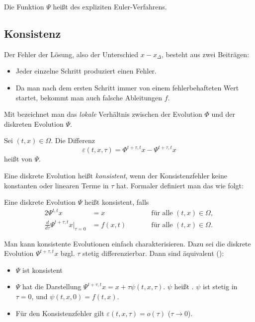Die Funktion $\Psi$ heißt  des expliziten Euler-Verfahrens.


\subsection{Konsistenz}

Der Fehler der Lösung, also der Unterschied $x - x_\Delta$, besteht aus zwei Beiträgen:
\begin{itemize}
	\item Jeder einzelne Schritt produziert einen Fehler.
	\item Da man nach dem ersten Schritt immer von einem fehlerbehafteten Wert startet, bekommt
	man auch falsche Ableitungen $f$.
\end{itemize}

Mit  bezeichnet man das \textit{lokale} Verhältnis zwischen der Evolution $\Phi$ und der diskreten Evolution $\Psi$.

\begin{defi}
	Sei $(t,x) \in \Omega$. Die Differenz 
	\begin{equation*}
		\varepsilon (t,x,\tau)=\Phi^{t+\tau,t} x-\Psi^{t+\tau,t} x
	\end{equation*}
	heißt  von $\Psi$.
\end{defi}

Eine diskrete Evolution heißt \emph{konsistent}, wenn der Konsistenzfehler keine
konstanten oder linearen Terme in $\tau$ hat. Formaler definiert man das wie folgt:

\begin{defi}
	Eine diskrete Evolution $\Psi$ heißt konsistent, falls
	\begin{alignat*}{2}
	\Psi^{t,t} x & =x &\qquad & \text{für alle $(t,x) \in \Omega$}, \\
	\frac{d}{d \tau} \Psi^{t+\tau,t} x \Big|_{\tau=0} & =f(x,t)
	&& \text{für alle $(t,x) \in \Omega$}.
	\end{alignat*}
\end{defi}


Man kann konsistente Evolutionen einfach charakterisieren. Dazu sei die diskrete Evolution $\Psi^{t+\tau,t} x$ bzgl. $\tau$ stetig differenzierbar. Dann sind äquivalent (\cite[Lemma~4.4]{deuflhard_bornemann:2008}):
\begin{itemize}
	\item $\Psi$ ist konsistent
	\item $\Psi$ hat die Darstellung $\Psi^{t+\tau,t} x=x+\tau \psi (t,x,\tau )$. $\psi$ heißt . $\psi$ ist stetig in $\tau = 0$, und $\psi (t,x,0)=f(t,x)$.
	\item Für den Konsistenzfehler gilt $\varepsilon (t,x,\tau)=o (\tau)$ ($\tau \to 0$).
\end{itemize}

